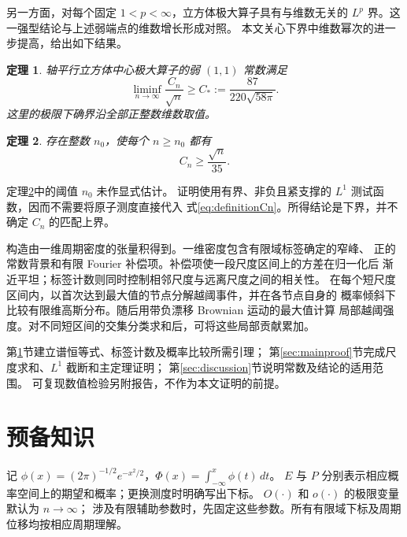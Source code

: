 \documentclass[UTF8,a4paper,11pt,fontset=fandol]{ctexart}
\newtheorem{theorem}{定理}
\theoremstyle{remark}
\begin{document}
另一方面，对每个固定 $1<p<\infty$，立方体极大算子具有与维数无关的
$L^p$ 界\cite{Bourgain2012}。这一强型结论与上述弱端点的维数增长形成对照。
本文关心下界中维数幂次的进一步提高，给出如下结果。

\begin{theorem}\label{thm:main}
轴平行立方体中心极大算子的弱 $(1,1)$ 常数满足
\begin{equation}\label{eq:mainconstant}
 \liminf_{n\to\infty}\frac{C_n}{\sqrt n}
 \ge C_*:=\frac{87}{220\sqrt{58\pi}}.
\end{equation}
这里的极限下确界沿全部正整数维数取值。
\end{theorem}

\begin{theorem}\label{thm:rational}
存在整数 $n_0$，使每个 $n\ge n_0$ 都有
\[
 C_n\ge\frac{\sqrt n}{35}.
\]
\end{theorem}

定理\ref{thm:rational}中的阈值 $n_0$ 未作显式估计。
证明使用有界、非负且紧支撑的 $L^1$ 测试函数，因而不需要将原子测度直接代入
式\eqref{eq:definitionCn}。所得结论是下界，并不确定 $C_n$ 的匹配上界。

构造由一维周期密度的张量积得到。一维密度包含有限域标签确定的窄峰、
正的常数背景和有限 Fourier 补偿项。补偿项使一段尺度区间上的方差在归一化后
渐近平坦；标签计数则同时控制相邻尺度与远离尺度之间的相关性。
在每个短尺度区间内，以首次达到最大值的节点分解越阈事件，并在各节点自身的
概率倾斜下比较有限维高斯分布。随后用带负漂移 Brownian 运动的最大值计算
局部越阈强度。对不同短区间的交集分类求和后，可将这些局部贡献累加。

第\ref{sec:prelim}节建立谱恒等式、标签计数及概率比较所需引理；
第\ref{sec:mainproof}节完成尺度求和、$L^1$ 截断和主定理证明；
第\ref{sec:discussion}节说明常数及结论的适用范围。
可复现数值检验另附报告，不作为本文证明的前提。

\section{预备知识}\label{sec:prelim}
记 $\phi(x)=(2\pi)^{-1/2}e^{-x^2/2}$，$\Phi(x)=\int_{-\infty}^x\phi(t)\,dt$。
$E$ 与 $P$ 分别表示相应概率空间上的期望和概率；更换测度时明确写出下标。
$O(\cdot)$ 和 $o(\cdot)$ 的极限变量默认为 $n\to\infty$；
涉及有限辅助参数时，先固定这些参数。所有有限域下标及周期位移均按相应周期理解。

\end{document}

